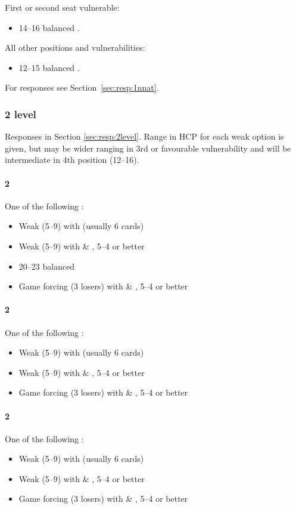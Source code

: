 First or second seat vulnerable:
\begin{itemize}
\item 14--16 balanced .
\end{itemize}

All other positions and vulnerabilities:
\begin{itemize}
\item 12--15 balanced .
\end{itemize}

For responses see Section~\ref{sec:resp:1nnat}.

\newpage 

\subsubsection{2 level}
\label{sec:open:2level}

Responses in Section \ref{sec:resp:2level}. Range in HCP for each weak option
is given, but may be wider ranging in 3rd or favourable vulnerability and will
be intermediate in 4th position (12--16).

\paragraph{2\clubs}
One of the following :
\begin{itemize}
\item Weak (5--9) with \diamonds (usually 6 cards)
\item Weak (5--9) with \hearts \& \spades, 5--4 or better
\item 20--23 balanced
\item Game forcing (3 losers) with \hearts \& \spades, 5--4 or better
\end{itemize}

\paragraph{2\diamonds}
One of the following :
\begin{itemize}
\item Weak (5--9) with \hearts (usually 6 cards)
\item Weak (5--9) with \spades \& \clubs, 5--4 or better 
\item Game forcing (3 losers) with \spades \& \clubs, 5--4 or better
\end{itemize}

\paragraph{2\hearts}
One of the following :
\begin{itemize}
\item Weak (5--9) with \spades (usually 6 cards)
\item Weak (5--9) with \clubs \& \diamonds, 5--4 or better
\item Game forcing (3 losers) with \clubs \& \diamonds, 5--4 or better
\end{itemize}

